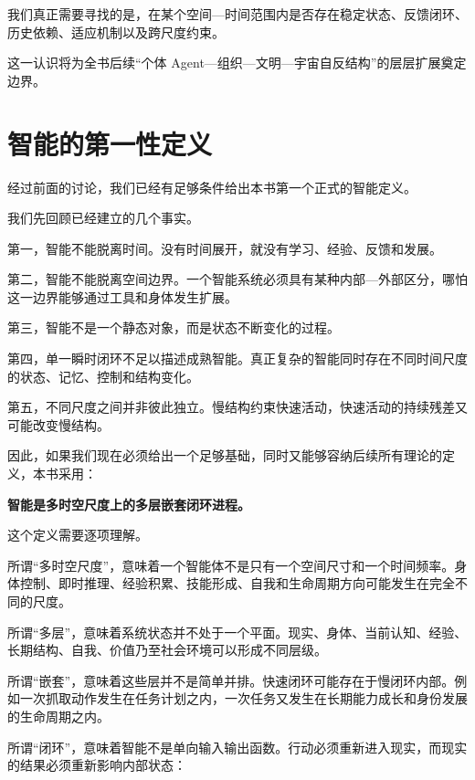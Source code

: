 我们真正需要寻找的是，在某个空间—时间范围内是否存在稳定状态、反馈闭环、历史依赖、适应机制以及跨尺度约束。

这一认识将为全书后续“个体 Agent—组织—文明—宇宙自反结构”的层层扩展奠定边界。

\section{智能的第一性定义}

经过前面的讨论，我们已经有足够条件给出本书第一个正式的智能定义。

我们先回顾已经建立的几个事实。

第一，智能不能脱离时间。没有时间展开，就没有学习、经验、反馈和发展。

第二，智能不能脱离空间边界。一个智能系统必须具有某种内部—外部区分，哪怕这一边界能够通过工具和身体发生扩展。

第三，智能不是一个静态对象，而是状态不断变化的过程。

第四，单一瞬时闭环不足以描述成熟智能。真正复杂的智能同时存在不同时间尺度的状态、记忆、控制和结构变化。

第五，不同尺度之间并非彼此独立。慢结构约束快速活动，快速活动的持续残差又可能改变慢结构。

因此，如果我们现在必须给出一个足够基础，同时又能够容纳后续所有理论的定义，本书采用：

\begin{definition*}
\bfseries 智能是多时空尺度上的多层嵌套闭环进程。
\end{definition*}

这个定义需要逐项理解。

所谓“多时空尺度”，意味着一个智能体不是只有一个空间尺寸和一个时间频率。身体控制、即时推理、经验积累、技能形成、自我和生命周期方向可能发生在完全不同的尺度。

所谓“多层”，意味着系统状态并不处于一个平面。现实、身体、当前认知、经验、长期结构、自我、价值乃至社会环境可以形成不同层级。

所谓“嵌套”，意味着这些层并不是简单并排。快速闭环可能存在于慢闭环内部。例如一次抓取动作发生在任务计划之内，一次任务又发生在长期能力成长和身份发展的生命周期之内。

所谓“闭环”，意味着智能不是单向输入输出函数。行动必须重新进入现实，而现实的结果必须重新影响内部状态：
\begin{statementbox}
\centering
{}
\end{statementbox}

